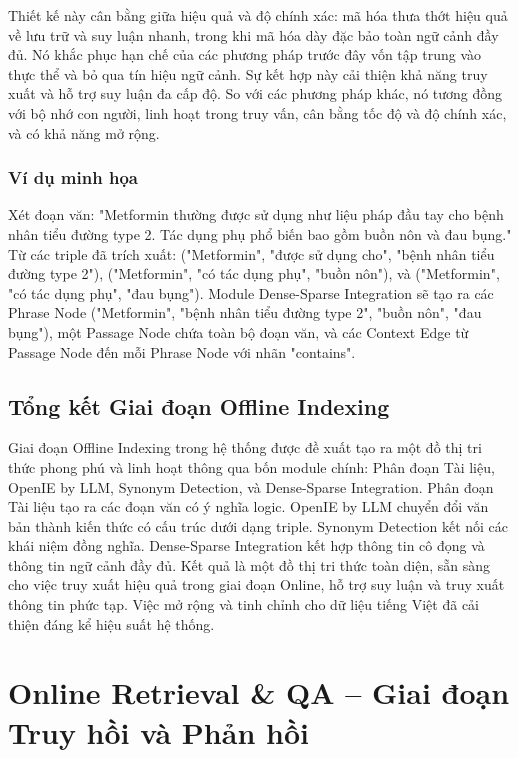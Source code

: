 \documentclass{article}
\begin{document}
Thiết kế này cân bằng giữa hiệu quả và độ chính xác: mã hóa thưa thớt hiệu quả về lưu trữ và suy luận nhanh, trong khi mã hóa dày đặc bảo toàn ngữ cảnh đầy đủ. Nó khắc phục hạn chế của các phương pháp trước đây vốn tập trung vào thực thể và bỏ qua tín hiệu ngữ cảnh. Sự kết hợp này cải thiện khả năng truy xuất và hỗ trợ suy luận đa cấp độ. So với các phương pháp khác, nó tương đồng với bộ nhớ con người, linh hoạt trong truy vấn, cân bằng tốc độ và độ chính xác, và có khả năng mở rộng.

\subsubsection{Ví dụ minh họa}
Xét đoạn văn: "Metformin thường được sử dụng như liệu pháp đầu tay cho bệnh nhân tiểu đường type 2. Tác dụng phụ phổ biến bao gồm buồn nôn và đau bụng." Từ các triple đã trích xuất: ("Metformin", "được sử dụng cho", "bệnh nhân tiểu đường type 2"), ("Metformin", "có tác dụng phụ", "buồn nôn"), và ("Metformin", "có tác dụng phụ", "đau bụng"). Module Dense-Sparse Integration sẽ tạo ra các Phrase Node ("Metformin", "bệnh nhân tiểu đường type 2", "buồn nôn", "đau bụng"), một Passage Node chứa toàn bộ đoạn văn, và các Context Edge từ Passage Node đến mỗi Phrase Node với nhãn "contains".

\subsection{Tổng kết Giai đoạn Offline Indexing}

Giai đoạn Offline Indexing trong hệ thống được đề xuất tạo ra một đồ thị tri thức phong phú và linh hoạt thông qua bốn module chính: Phân đoạn Tài liệu, OpenIE by LLM, Synonym Detection, và Dense-Sparse Integration. Phân đoạn Tài liệu tạo ra các đoạn văn có ý nghĩa logic. OpenIE by LLM chuyển đổi văn bản thành kiến thức có cấu trúc dưới dạng triple. Synonym Detection kết nối các khái niệm đồng nghĩa. Dense-Sparse Integration kết hợp thông tin cô đọng và thông tin ngữ cảnh đầy đủ. Kết quả là một đồ thị tri thức toàn diện, sẵn sàng cho việc truy xuất hiệu quả trong giai đoạn Online, hỗ trợ suy luận và truy xuất thông tin phức tạp. Việc mở rộng và tinh chỉnh cho dữ liệu tiếng Việt đã cải thiện đáng kể hiệu suất hệ thống.

\section{Online Retrieval \& QA – Giai đoạn Truy hồi và Phản hồi}
\end{document}
